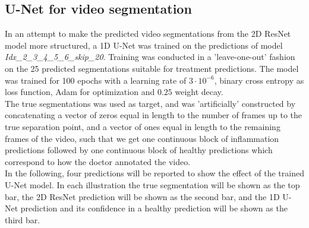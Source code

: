 \subsection{U-Net for video segmentation}
In an attempt to make the predicted video segmentations from the 2D ResNet model more structured, a 1D U-Net was trained on the predictions of model \textit{Idx\_2\_3\_4\_5\_6\_skip\_20}. Training was conducted in a 'leave-one-out' fashion on the 25 predicted segmentations suitable for treatment predictions. The model was trained for 100 epochs with a learning rate of $3\cdot 10^{-6}$, binary cross entropy as loss function, Adam for optimization and $0.25$ weight decay.\\
The true segmentations was used as target, and was 'artificially' constructed by concatenating a vector of zeros equal in length to the number of frames up to the true separation point, and a vector of ones equal in length to the remaining frames of the video, such that we get one continuous block of inflammation predictions followed by one continuous block of healthy predictions which correspond to how the doctor annotated the video.\\
In the following, four predictions will be reported to show the effect of the trained U-Net model. In each illustration the true segmentation will be shown as the top bar, the 2D ResNet prediction will be shown as the second bar, and the 1D U-Net prediction and its confidence in a healthy prediction will be shown as the third bar.

